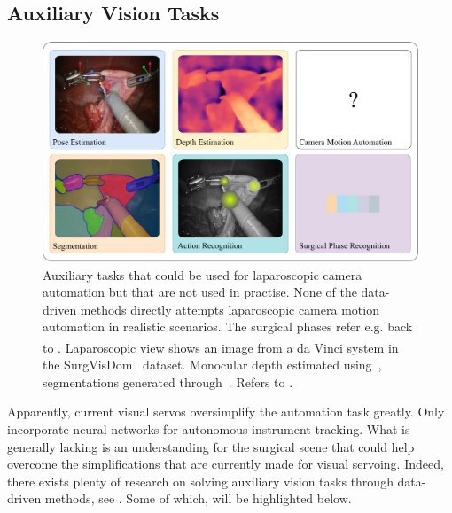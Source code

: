 \subsection{Auxiliary Vision Tasks}
\label{in:sec:auxiliary_tasks}
\begin{figure}[tb]
    \centering
    \includegraphics[width=\textwidth]{introduction/fig/auxiliary_tasks.pdf}
    \caption{Auxiliary tasks that could be used for laparoscopic camera automation but that are not used in practise. None of the data-driven methods directly attempts laparoscopic camera motion automation in realistic scenarios. The surgical phases refer e.g. back to . Laparoscopic view shows an image from a da Vinci\textsuperscript{\textregistered} system in the SurgVisDom~\cite{zia2021surgical} dataset. Monocular depth estimated using~\cite{oquab2023dinov2}, segmentations generated through~\cite{segment_anything}. Refers to .}
    \label{in:fig:auxiliary_tasks}
\end{figure}
Apparently, current visual servos oversimplify the automation task greatly. Only~\cite{gruijthuijsen2021autonomous} incorporate neural networks for autonomous instrument tracking. What is generally lacking is an understanding for the surgical scene that could help overcome the simplifications that are currently made for visual servoing. Indeed, there exists plenty of research on solving auxiliary vision tasks through data-driven methods, see . Some of which, will be highlighted below. 

